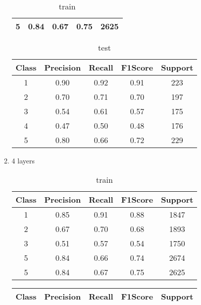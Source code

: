 \begin{enumerate}[label=(\alph*)]
\begin{enumerate}[label=\roman*.]
\begin{table}[!htb]
\begin{tabular}{ccccc}
            5     & 0.84      & 0.67   & 0.75    & 2625    \\ \hline
            \end{tabular}
            \caption{train}
            \label{part d train depth 3}
        \end{table}
        \begin{table}[!htb]
            \centering
            \begin{tabular}{ccccc}
            \hline
            Class & Precision & Recall & F1Score & Support \\ \hline
            1     & 0.90      & 0.92   & 0.91    & 223     \\
            2     & 0.70      & 0.71   & 0.70    & 197     \\
            3     & 0.54      & 0.61   & 0.57    & 175     \\
            4     & 0.47      & 0.50   & 0.48    & 176     \\
            5     & 0.80      & 0.66   & 0.72    & 229     \\ \hline
            \end{tabular}
            \caption{test}
            \label{part d test depth 3}
        \end{table}
        \item 4 layers
        \begin{table}[!htb]
            \centering
            \begin{tabular}{ccccc}
            \hline
            Class & Precision & Recall & F1Score & Support \\ \hline
            1     & 0.85      & 0.91   & 0.88    & 1847    \\
            2     & 0.67      & 0.70   & 0.68    & 1893    \\
            3     & 0.51      & 0.57   & 0.54    & 1750    \\
            5     & 0.84      & 0.66   & 0.74    & 2674    \\
            5     & 0.84      & 0.67   & 0.75    & 2625    \\ \hline
            \end{tabular}
            \caption{train}
            \label{part d train depth 4}
            \end{table}
        \begin{table}[!htb]
            \centering
            \begin{tabular}{ccccc}
            \hline
            Class & Precision & Recall & F1Score & Support \\ \hline

\end{tabular}
\end{table}
\end{enumerate}
\end{enumerate}

